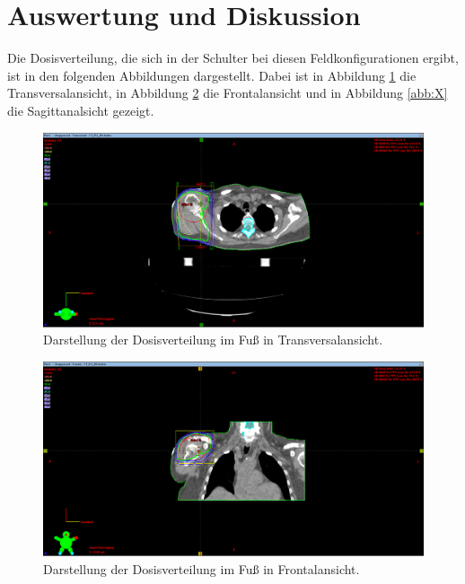 \section{Auswertung und Diskussion}
\label{sec:Auswertung}

Die Dosisverteilung, die sich in der Schulter bei diesen Feldkonfigurationen ergibt, ist in den folgenden
Abbildungen dargestellt. Dabei ist in Abbildung \ref{abb:Z} die Transversalansicht, in Abbildung \ref{abb:Y} die
Frontalansicht und in Abbildung \ref{abb:X} die Sagittanalsicht gezeigt.

\begin{figure}[H]
  \centering
  \includegraphics[width=\textwidth]{Bilder/SchulterZ.png}
  \caption{Darstellung der Dosisverteilung im Fuß in Transversalansicht.}
  \label{abb:Z}
\end{figure}

\begin{figure}[H]
  \centering
  \includegraphics[width=\textwidth]{Bilder/SchulterY.png}
  \caption{Darstellung der Dosisverteilung im Fuß in Frontalansicht.}
  \label{abb:Y}
\end{figure}

